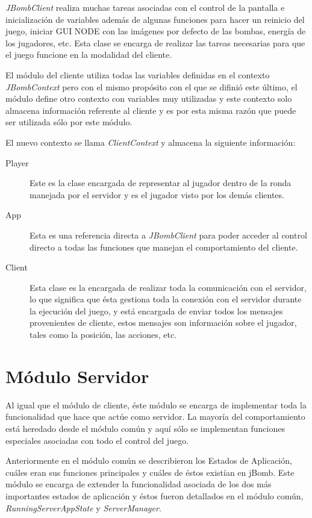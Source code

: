 \documentclass[a4paper,12pt,openany,oneside]{book}
\begin{document}
\textit{JBombClient} realiza muchas tareas asociadas con el control de la pantalla e inicialización de variables además de algunas funciones para hacer un reinicio del juego, iniciar GUI NODE con las imágenes por defecto de las bombas, energía de los jugadores, etc. Esta clase se encarga de realizar las tareas necesarias para que el juego funcione en la modalidad del cliente.

El módulo del cliente utiliza todas las variables definidas en el contexto \textit{JBombContext} pero con el mismo propósito con el que se difinió este último, el módulo define otro contexto con variables muy utilizadas y este contexto solo almacena información referente al cliente y es por esta misma razón que puede ser utilizada sólo por este módulo.

El nuevo contexto se llama \textit{ClientContext} y almacena la siguiente información:
\begin{description}
\item[Player] Este es la clase encargada de representar al jugador dentro de la ronda manejada por el servidor y es el jugador visto por los demás clientes.
\item[App] Esta es una referencia directa a \textit{JBombClient} para poder acceder al control directo a todas las funciones que manejan el comportamiento del cliente.
\item[Client] Esta clase es la encargada de realizar toda la comunicación con el servidor, lo que significa que ésta gestiona toda la conexión con el servidor durante la ejecución del juego, y está encargada de enviar todos los mensajes provenientes de cliente, estos mensajes son información sobre el jugador, tales como la posición, las acciones, etc.
\end{description}
\section{Módulo Servidor}
Al igual que el módulo de cliente, éste módulo se encarga de implementar toda la funcionalidad que hace que actúe como servidor. La mayoría del comportamiento está heredado desde el módulo común y aquí sólo se implementan funciones especiales asociadas con todo el control del juego.

Anteriormente en el módulo común se describieron los Estados de Aplicación, cuáles eran sus funciones principales y cuáles de éstos existían en jBomb. Este módulo se encarga de extender la funcionalidad asociada de los dos más importantes estados de aplicación y éstos fueron detallados en el módulo común, \textit{RunningServerAppState} y \textit{ServerManager}. 
\end{document}
